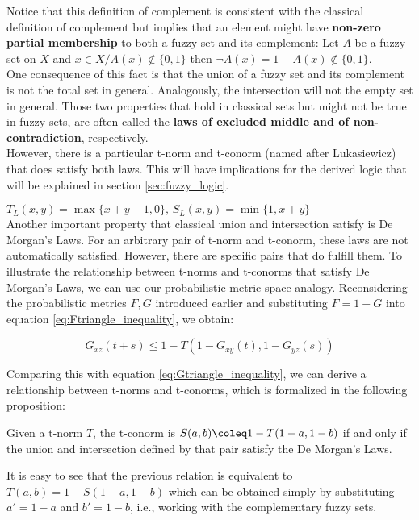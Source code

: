 Notice that this definition of complement is consistent with the classical definition of complement but implies that an element might have \textbf{non-zero partial membership} to both a fuzzy set and its complement: Let $A$ be a fuzzy set on $X$ and $x \in X / A(x)\notin \{0,1\}$ then $\lnot A(x)= 1 - A(x) \notin \{0,1\}$.\\

One consequence of this fact is that the union of a fuzzy set and its complement is not the total set in general. Analogously, the intersection will not the empty set in general. Those two properties that hold in classical sets but might not be true in fuzzy sets, are often called the \textbf{laws of excluded middle and of non-contradiction}, respectively.\\

However, there is a particular t-norm and t-conorm (named after Lukasiewicz) that does satisfy both laws. This will have implications for the derived logic that will be explained in section \ref{sec:fuzzy_logic}. 

\hspace{10em}$T_L(x,y)=\max\{x+y-1,0\},\, S_L(x,y)=\min\{1,x+y\}$\\

Another important property that classical union and intersection satisfy is De Morgan's Laws. For an arbitrary pair of t-norm and t-conorm, these laws are not automatically satisfied. However, there are specific pairs that do fulfill them. To illustrate the relationship between t-norms and t-conorms that satisfy De Morgan's Laws, we can use our probabilistic metric space analogy. Reconsidering the probabilistic metrics $F,G$ introduced earlier and substituting $F = 1 - G$ into equation \ref{eq:Ftriangle_inequality}, we obtain:

\[ G_{xz}(t + s) \leq 1 - T(1 - G_{xy}(t), 1 - G_{yz}(s))\]

Comparing this with equation \ref{eq:Gtriangle_inequality}, we can derive a relationship between t-norms and t-conorms, which is formalized in the following proposition:

\begin{proposition}
  Given a t-norm $T$, the t-conorm is $S(a,b)\coleq 1 - T(1-a, 1-b)$ if and only if the union and intersection defined by that pair satisfy the De Morgan's Laws.
\end{proposition}
\begin{remark}
  It is easy to see that the previous relation is equivalent to $T(a,b) = 1-S(1-a, 1-b)$ which can be obtained simply by substituting $a'=1-a$ and $b'=1-b$, i.e., working with the complementary fuzzy sets.
\end{remark}

